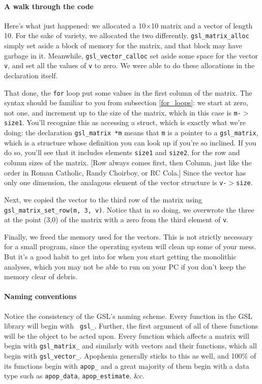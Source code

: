 \paragraph{A walk through the code}
Here's what just happened: we allocated a 10$\times$10 matrix and a vector of
length 10.  For the sake of variety, we  allocated the two differently.
{\tt gsl\_matrix\_alloc} simply set aside a block of memory for the matrix,
and that block may have garbage in it. Meanwhile, {\tt gsl\_vector\_calloc} set
aside some space for the vector {\tt v}, and set all the values of {\tt v} to
zero.  We were able to do these allocations in the declaration itself.

That done, the {\tt for} loop put some values in the first column of the matrix. 
The syntax should be familiar to you from subsection \ref{for_loops}: we start at
zero, not one, and increment up to the size of the matrix, which in this case is
{\tt m-$>$size1}. You'll recognize this as accessing a struct, which is exactly
what we're doing: the declaration {\tt gsl\_matrix *m} means that {\tt m} is a
pointer to a {\tt gsl\_matrix}, which is a structure whose definition you can
look up if you're so inclined. If you do so, you'll see that it includes 
elements {\tt size1} and {\tt size2}, for the row and column sizes of the
matrix. [Row always comes first, then Column, just like the order in Roman Catholic, 
Randy Choirboy, or RC Cola.] Since the vector has only one dimension, the analagous element
of the vector structure is {\tt v-$>$size}.

Next, we copied the vector to the third row of the matrix using {\tt
gsl\-\_matrix\-\_set\-\_row(m, 3, v)}. Notice that in so doing, we
overwrote the three at the point (3,0) of the matrix with a zero from
the third element of {\tt v}.

Finally, we freed the memory used for the vectors. This is not strictly
necessary for a small program, since the operating system
will clean up some of your mess. But it's a good habit to get into for
when you start getting the monolithic analyses, which you may not be
able to run on your PC if you don't keep the memory clear of debris.

\paragraph{Naming conventions}  
Notice the consistency of
the GSL's naming scheme. Every function in the GSL library will begin with {\tt
gsl\_}. 
Further, the first argument of all of these functions will be the object to be acted upon.
Every function which affects a matrix will begin with {\tt gsl\_matrix\_}
and similarly with vectors and their functions, which all begin with {\tt gsl\_vector\_}. 
Apophenia generally sticks to this as well, and 100\% of its functions
begin with {\tt apop\_} and a great majority of them begin with a data
type such as {\tt apop\_data}, {\tt apop\_estimate}, \&c.

